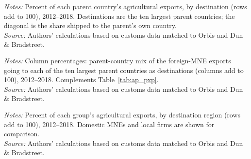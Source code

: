 \documentclass[11pt,a4paper]{article}
\newcommand{\srcnote}{\textit{Source:} Authors' calculations based on customs data matched to Orbis and Dun \& Bradstreet.}
\begin{document}
\begin{table}[H]\centering\small%
  \caption{Foreign-Multinational Agricultural Exports to the Parent Countries, by Parent Country}%
  \label{tab:ap_pxp}%
  \par\vspace{3pt}%
  \begin{minipage}{0.95\textwidth}\footnotesize %
  \textit{Notes:} Percent of each parent country's agricultural exports, by destination (rows add to 100), 2012--2018. Destinations are the ten largest parent countries; the diagonal is the share shipped to the parent's own country.\\[3pt]%
  \srcnote%
  \end{minipage}%
  \end{table}
\begin{table}[H]\centering\footnotesize%
  \caption{Foreign-Multinational Agricultural Exports to the Parent Countries, by Destination}%
  \label{tab:ap_pxp_col}%
  \par\vspace{3pt}%
  \begin{minipage}{0.95\textwidth}\footnotesize %
  \textit{Notes:} Column percentages: parent-country mix of the foreign-MNE exports going to each of the ten largest parent countries as destinations (columns add to 100), 2012--2018. Complements Table~\ref{tab:ap_pxp}.\\[3pt]%
  \srcnote%
  \end{minipage}%
  \end{table}
\begin{table}[H]\centering\small%
  \caption{Destination of Multinational Agricultural Exports, by Parent Region}%
  \label{tab:ap_reg}%
  \par\vspace{3pt}%
  \begin{minipage}{0.95\textwidth}\footnotesize %
  \textit{Notes:} Percent of each group's agricultural exports, by destination region (rows add to 100), 2012--2018. Domestic MNEs and local firms are shown for comparison.\\[3pt]%
  \srcnote%
  \end{minipage}%
  \end{table}
\end{document}

